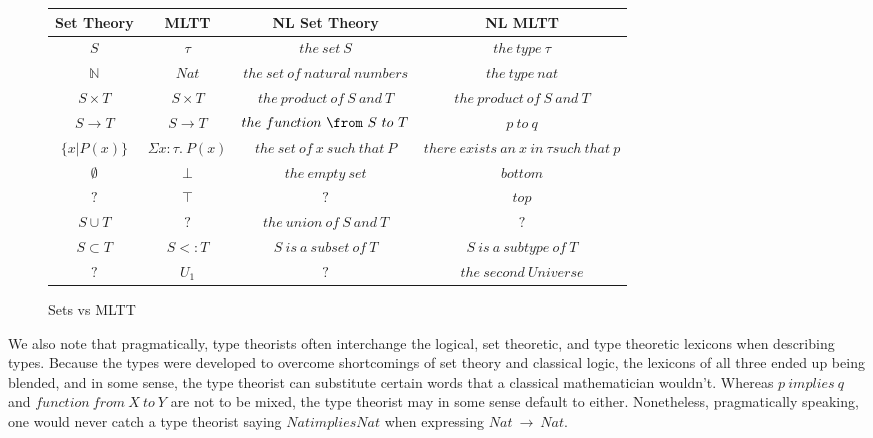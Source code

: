 \begin{figure}[H]
\centering
\begin{tabular}{|c|c|c|c|} \hline
 Set Theory & MLTT & NL Set Theory & NL MLTT \\ \hline
 $S$          & $\tau$                 & $the\ set\ S$                     & $the\ type\ \tau$ \\ 
 $\mathbb{N}$ & $Nat$                  & $the\ set\ of\ natural\ numbers$  & $the\ type\ nat$ \\
 $S \times T$ & $S \times T$           & $the\ product\ of\ S\ and\ T$     & $the\  product\  of\  S\  and\  T$ \\
 $S \to T$    & $S \to T$              & $the\ function\ \from\ S\ to\ T$  & $p\  to\  q$ \\
 $\{x|P(x)\}$ & $\Sigma x : \tau.\ P(x)$ & $the\ set\ of\ x\ such\ that\ P$  & $there\ exists\ an\ x\ in\ \tau such\ that\ p$ \\
  $\emptyset$  & $\bot$                 & $the\ empty\ set$                 & $bottom$ \\
 $?$          & $\top$                 & $?$                             & $top$ \\
 $S \cup T$   & $?$                    & $the\ union\ of\ S\ and\ T$       & $?$ \\
 $S \subset T$ & $S <: T$              & $S\ is\ a\ subset\ of\ T$          & $S\ is\ a\ subtype\ of\ T$ \\
 $?$          & $U_1$                  & $?$ & $the\ second\ Universe$        \\ \hline 
\end{tabular}
\caption{Sets vs MLTT} \label{fig:M6}
\end{figure}


We also note that pragmatically, type theorists often interchange the logical,
set theoretic, and type theoretic lexicons when describing types. Because the
types were developed to overcome shortcomings of set theory and classical logic,
the lexicons of all three ended up being blended, and in some sense, the type
theorist can substitute certain words that a classical mathematician
wouldn't.  Whereas $p\ implies\ q$ and $function\ from\ X\ to\ Y$ are not to
be mixed, the type theorist may in some sense default to either.
Nonetheless, pragmatically speaking, one would never catch a type theorist
saying $Nat implies Nat$ when expressing $Nat\ \to\ Nat$.


